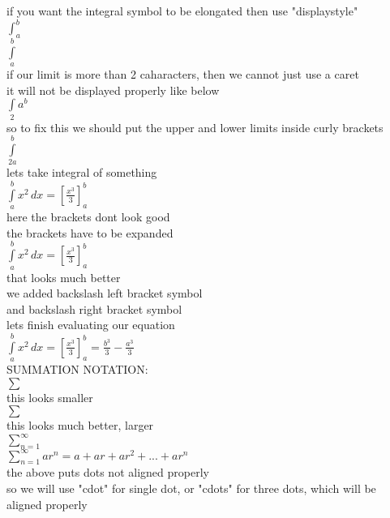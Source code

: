 \documentclass[11pt]{article}
\begin{document}
if you want the integral symbol to be elongated then use "displaystyle"\\
$\displaystyle{\int_a^b}$\\
$\displaystyle{\int \limits_a^b}$\\

if our limit is more than 2 caharacters, then we cannot just use a caret\\
it will not be displayed properly like below\\
$\displaystyle{\int \limits_2a^b}$\\

so to fix this we should put the upper and lower limits inside curly brackets\\
$\displaystyle{\int \limits_{2a}^{b}}$\\

lets take integral of something\\
$\displaystyle{\int \limits_{a}^{b}x^2 \,dx=[\frac{x^3}{3}]_{a}^{b}}$\\
here the brackets dont look good\\
the brackets have to be expanded\\

$\displaystyle{\int \limits_{a}^{b}x^2 \,dx=\left[\frac{x^3}{3}\right]_{a}^{b}}$\\
that looks much better\\
we added backslash left bracket symbol\\
and backslash right bracket symbol\\

lets finish evaluating our equation\\
$\displaystyle{\int \limits_{a}^{b}x^2 \,dx=\left[\frac{x^3}{3}\right]_{a}^{b}=\frac{b^3}{3}-\frac{a^3}{3}}$\\


SUMMATION NOTATION:\\

$\sum$\\
this looks smaller\\

$\displaystyle{\sum}$\\
this looks much better, larger\\


$\displaystyle{\sum \limits_{n=1}^{\infty}}$\\

$\displaystyle{     \sum \limits_{n=1}^{\infty}  ar^n=a+ar+ar^2+...+ar^n   }$\\
the above puts dots not aligned properly\\
so we will use "cdot" for single dot, or "cdots" for three dots, which will be aligned properly\\
\end{document}
